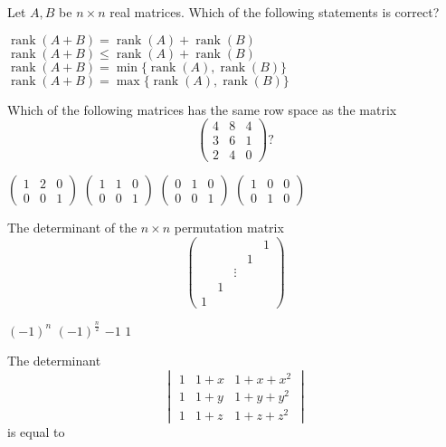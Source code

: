 \documentclass[10pt]{exam}
\DeclareMathOperator{\rank}{\text{rank}}
\begin{document}
\begin{questions}
\question
Let $A,B$ be $n\times n$ real matrices. Which of the following statements is correct?

\begin{choices}
\choice $\rank(A+B)=\rank(A)+\rank(B)$
\choice $\rank(A+B)\leq \rank(A)+\rank(B)$
\choice $\rank(A+B)=\min\{\rank(A),\rank(B)\}$
\choice $\rank(A+B)=\max\{\rank(A),\rank(B)\}$
\end{choices}


\question
Which of the following matrices has the same row space as the matrix
$$ \begin{pmatrix} 4 & 8 & 4 \\ 3 & 6 & 1 \\ 2 & 4 & 0 \end{pmatrix} ?$$

\begin{oneparchoices}
\choice $ \begin{pmatrix} 1 & 2 & 0 \\ 0 & 0 & 1 \end{pmatrix} $
\choice $ \begin{pmatrix} 1 & 1 & 0 \\ 0 & 0 & 1 \end{pmatrix} $
\choice $ \begin{pmatrix} 0 & 1 & 0 \\ 0 & 0 & 1 \end{pmatrix} $
\choice $ \begin{pmatrix} 1 & 0 & 0 \\ 0 & 1 & 0 \end{pmatrix} $
\end{oneparchoices} 

\question 
The determinant of the $n \times n$ permutation matrix 
$$ \begin{pmatrix}&&&&1 \\ & & & 1 &  \\ & & \vdots & & \\ & 1  && & \\1 &&&& \end{pmatrix} $$

\begin{oneparchoices}
\choice $(-1)^n$ 
\choice $(-1)^{\frac{n}{2}}$
\choice $-1$ 
\choice $1$
\end{oneparchoices}

\question
The determinant 
$$ \begin{vmatrix} 1 & 1+x & 1+x+x^2 \\ 1 & 1 + y & 1 + y + y^2 \\ 1 & 1 + z & 1 + z + z^2  \end{vmatrix} $$
is equal to 


\end{questions}
\end{document}
